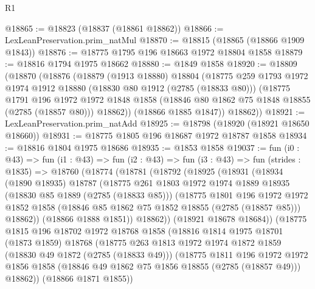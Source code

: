 \begin{lexlean}{R1}
\begin{coremodule}
@18865 := @18823 (@18837 (@18861 @18862))
@18866 := LexLeanPreservation.prim_natMul
@18870 := @18815 (@18865 (@18866 @1909 @1843))
@18876 := @18775 @1795 @196 @18663 @1972 @18804 @1858
@18879 := @18816 @1794 @1975 @18662
@18880 := @1849 @1858
@18920 := @18809
    (@18870
      (@18876
        (@18879
          (@1913 @18880)
          @18804
          (@18775
            @259
            @1793
            @1972
            @1974
            @1912
            @18880
            (@18830 @80 @1912 (@2785 (@18833 @80)))
            (@18775
              @1791
              @196
              @1972
              @1972
              @1848
              @1858
              (@18846 @80 @1862 @75 @1848 @18855 (@2785 (@18857 @80)))
              @18862))
          (@18866 @1885 @1847))
        @18862))
@18921 := LexLeanPreservation.prim_natAdd
@18925 := @18798 (@18920 (@18921 @18650 @18660))
@18931 := @18775 @1805 @196 @18687 @1972 @18787 @1858
@18934 := @18816 @1804 @1975 @18686
@18935 := @1853 @1858
@19037 := fun (i0 : @43) =>
  fun (i1 : @43) =>
  fun (i2 : @43) =>
  fun (i3 : @43) =>
  fun (strides : @1835) =>
  @18760
    (@18774
      (@18781
        (@18792
          (@18925
            (@18931
              (@18934
                (@1890 @18935)
                @18787
                (@18775
                  @261
                  @1803
                  @1972
                  @1974
                  @1889
                  @18935
                  (@18830 @85 @1889 (@2785 (@18833 @85)))
                  (@18775
                    @1801
                    @196
                    @1972
                    @1972
                    @1852
                    @1858
                    (@18846 @85 @1862 @75 @1852 @18855 (@2785 (@18857 @85)))
                    @18862))
                (@18866 @1888 @1851))
              @18862))
          (@18921 @18678 @18684))
        (@18775
          @1815
          @196
          @18702
          @1972
          @18768
          @1858
          (@18816
            @1814
            @1975
            @18701
            (@1873 @1859)
            @18768
            (@18775
              @263
              @1813
              @1972
              @1974
              @1872
              @1859
              (@18830 @49 @1872 (@2785 (@18833 @49)))
              (@18775
                @1811
                @196
                @1972
                @1972
                @1856
                @1858
                (@18846 @49 @1862 @75 @1856 @18855 (@2785 (@18857 @49)))
                @18862))
            (@18866 @1871 @1855))

\end{coremodule}
\end{lexlean}
